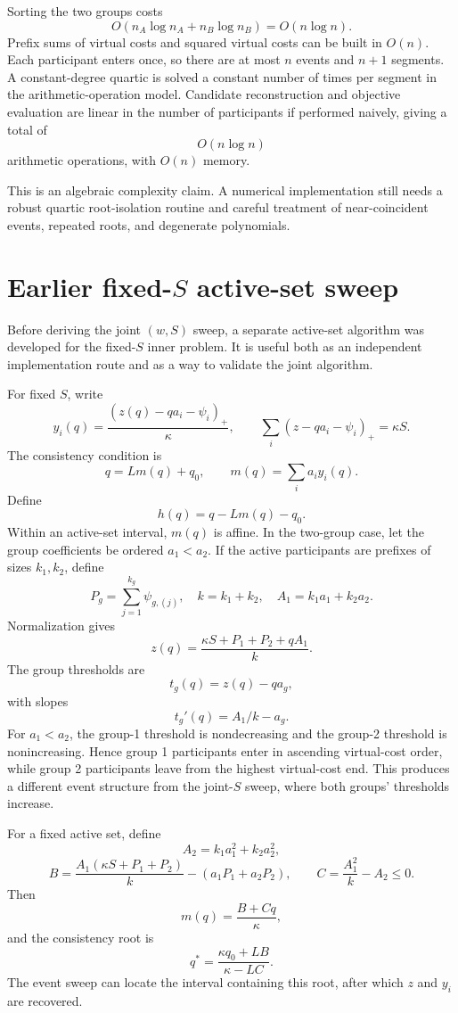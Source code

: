 \documentclass[11pt,a4paper]{article}
\newcommand{\1}{\mathbf{1}}
\begin{document}
Sorting the two groups costs
\[
  O(n_A\log n_A+n_B\log n_B)=O(n\log n).
\]
Prefix sums of virtual costs and squared virtual costs can be built in
\(O(n)\). Each participant enters once, so there are at most \(n\)
events and \(n+1\) segments. A constant-degree quartic is solved a
constant number of times per segment in the arithmetic-operation model.
Candidate reconstruction and objective evaluation are linear in the
number of participants if performed naively, giving a total of
\[
  \boxed{O(n\log n)}
\]
arithmetic operations, with \(O(n)\) memory.

This is an algebraic complexity claim. A numerical implementation still
needs a robust quartic root-isolation routine and careful treatment of
near-coincident events, repeated roots, and degenerate polynomials.

\section{Earlier fixed-\texorpdfstring{$S$}{S} active-set sweep}

Before deriving the joint \((w,S)\) sweep, a separate active-set
algorithm was developed for the fixed-\(S\) inner problem. It is useful
both as an independent implementation route and as a way to validate
the joint algorithm.

For fixed \(S\), write
\[
  y_i(q)=\frac{(z(q)-qa_i-\psi_i)_+}{\kappa},
  \qquad
  \sum_i(z-qa_i-\psi_i)_+=\kappa S.
\]
The consistency condition is
\[
  q=Lm(q)+q_0,
  \qquad
  m(q)=\sum_i a_i y_i(q).
\]
Define
\[
  h(q)=q-Lm(q)-q_0.
\]
Within an active-set interval, \(m(q)\) is affine. In the two-group
case, let the group coefficients be ordered \(a_1<a_2\). If the active
participants are prefixes of sizes \(k_1,k_2\), define
\[
  P_g=\sum_{j=1}^{k_g}\psi_{g,(j)},\quad
  k=k_1+k_2,\quad
  A_1=k_1a_1+k_2a_2.
\]
Normalization gives
\[
  z(q)=\frac{\kappa S+P_1+P_2+qA_1}{k}.
\]
The group thresholds are
\[
  t_g(q)=z(q)-qa_g,
\]
with slopes
\[
  t_g'(q)=A_1/k-a_g.
\]
For \(a_1<a_2\), the group-1 threshold is nondecreasing and the
group-2 threshold is nonincreasing. Hence group 1 participants enter
in ascending virtual-cost order, while group 2 participants leave from
the highest virtual-cost end. This produces a different event structure
from the joint-\(S\) sweep, where both groups' thresholds increase.

For a fixed active set, define
\[
  A_2=k_1a_1^2+k_2a_2^2,
\]
\[
  B=\frac{A_1(\kappa S+P_1+P_2)}{k}
    -(a_1P_1+a_2P_2),
\qquad
  C=\frac{A_1^2}{k}-A_2\leq0.
\]
Then
\[
  m(q)=\frac{B+Cq}{\kappa},
\]
and the consistency root is
\[
  q^*=\frac{\kappa q_0+LB}{\kappa-LC}.
\]
The event sweep can locate the interval containing this root, after
which \(z\) and \(y_i\) are recovered.
\end{document}
